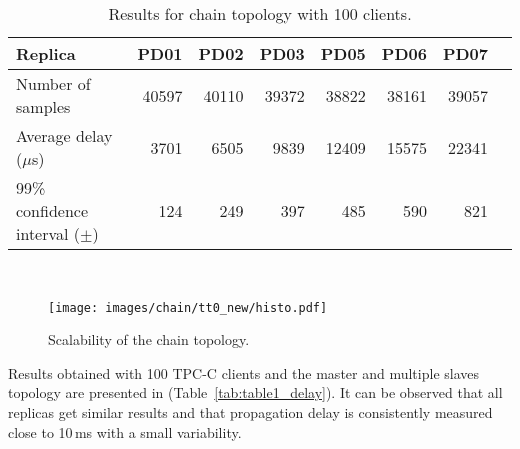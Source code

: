 \begin{table}[t]
\centering    
\begin{tabular}{lrrrrrrr}
 \hline\hline
 Replica & PD01 & PD02 & PD03 & PD05 & PD06 & PD07 \\
\hline
Number of samples & 40597 & 40110 & 39372 & 38822 & 38161 & 39057 \\
Average delay ($\mu$s) & 3701 & 6505 & 9839 & 12409 & 15575 & 22341 \\
99\% confidence interval ($\pm$) & 124 & 249 & 397 & 485 & 590 & 821 \\
\hline
\end{tabular}

~\\
\caption{Results for chain topology with 100 clients.}
\label{tab:table2_delay}
\end{table}

\begin{figure}[t]
\centering    
\texttt{[image: images/chain/tt0\_new/histo.pdf]}
\caption{Scalability of the chain topology.}
\label{fig:graph2}
\end{figure}

\begin{comment}
Results obtained with 100 TPC-C clients and the master and multiple slaves topology are presented in (Table~\ref{tab:table1_delay}). It can be observed that all replicas get similar results and that the propagation delay is consistently measured close to 10\,ms with a small variability. This represents an upper bound on the worst case scenario staleness that a client can observe by reading from the master and any other replica if the replication connection is operational.

Results with an different numbers of TPC-C clients can be found in (Figure \ref{fig:graph1}). They show that propagation delay grows substantially with the load imposed on the master. At the same time, as idle periods get less and less frequent due to the higher amount of information to transfer, the probability of a client being able to read stale data grows accordingly.
\end{comment}

Results obtained with 100 TPC-C clients and the master and multiple slaves topology are presented in (Table~\ref{tab:table1_delay}). It can be observed that all replicas get similar results and that propagation delay is consistently measured close to 10\,ms with a small variability. 

